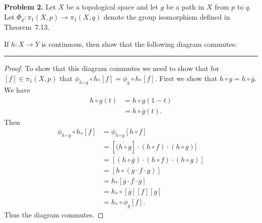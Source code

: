 \documentclass[leqno]{article}
\theoremstyle{nonumberplain}
\newtheorem{proof}{Proof}
\begin{document}
\noindent\textbf{Problem 2.} Let $X$ be a topological space and let $g$ be a path in $X$ from $p$ to $q$. Let $\Phi_g\colon\pi_1(X,p)\to\pi_1(X,q)$ denote the group isomorphism defined in Theorem~7.13.

If $h\colon X\to Y$ is continuous, then show that the following diagram commutes:
\begin{center}
\end{center}


\noindent\rule[0.5ex]{\linewidth}{1pt}

\begin{proof}
To show that this diagram commutes we need to show that for $[f]\in \pi_1 (X,p)$ that $\phi_{h\circ g} \circ h_* [f]=\phi_g \circ h_* [f]$. First we show that $\overline{h\circ g} = h \circ \overline{g}$.  We have
\begin{align*}
\overline{h\circ g}(t)&=h\circ g (1-t)\\
&= h \circ \overline{g}(t).
\end{align*}
Then
\begin{align*}
\phi_{h\circ g} \circ h_* [f] &= \phi_{h\circ g} [h\circ f]\\
&= [\overline{(h\circ g}]\cdot (h\circ f) \cdot (h\circ g)]\\
&= [(h\circ \overline{g})\cdot (h\circ f) \cdot (h\circ g)]\\
&= [h \circ (\overline{g} \cdot f \cdot g)]\\
&= h_* [\overline{g} \cdot f \cdot g]\\
&= h_* \circ [\overline{g}][f][g]\\
&= h_* \circ \phi_g [f].
\end{align*}
Thus the diagram commutes.
\end{proof}


\pagebreak


\end{document}
